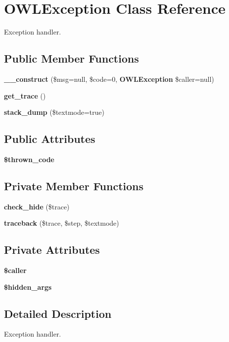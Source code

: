 \section{OWLException Class Reference}
\label{classOWLException}


Exception handler.  


\subsection*{Public Member Functions}
\begin{DoxyCompactItemize}
\item 
{\bf \_\-\_\-construct} (\$msg=null, \$code=0, {\bf OWLException} \$caller=null)
\item 
{\bf get\_\-trace} ()
\item 
{\bf stack\_\-dump} (\$textmode=true)
\end{DoxyCompactItemize}
\subsection*{Public Attributes}
\begin{DoxyCompactItemize}
\item 
{\bf \$thrown\_\-code}
\end{DoxyCompactItemize}
\subsection*{Private Member Functions}
\begin{DoxyCompactItemize}
\item 
{\bf check\_\-hide} (\$trace)
\item 
{\bf traceback} (\$trace, \$step, \$textmode)
\end{DoxyCompactItemize}
\subsection*{Private Attributes}
\begin{DoxyCompactItemize}
\item 
{\bf \$caller}
\item 
{\bf \$hidden\_\-args}
\end{DoxyCompactItemize}


\subsection{Detailed Description}
Exception handler. 

